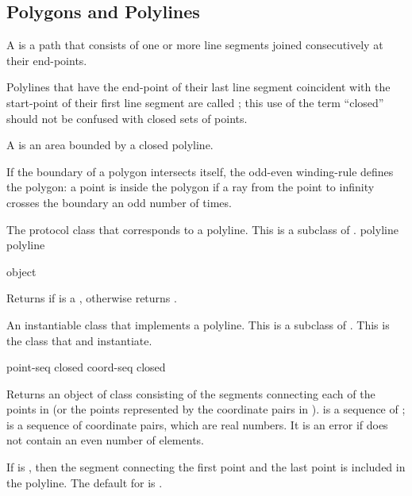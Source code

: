 \subsection {Polygons and Polylines}

A  is a path that consists of one or more line segments joined
consecutively at their end-points.

Polylines that have the end-point of their last line segment coincident with the
start-point of their first line segment are called ; this use of
the term ``closed'' should not be confused with closed sets of points.

A  is an area bounded by a closed polyline. 

If the boundary of a polygon intersects itself, the odd-even winding-rule
defines the polygon: a point is inside the polygon if a ray from the point to
infinity crosses the boundary an odd number of times.


The protocol class that corresponds to a polyline.  This is a subclass of
.
 {polyline} {polyline}

 {object}

Returns  if  is a , otherwise returns
.


An instantiable class that implements a polyline.  This is a subclass of
.  This is the class that  and
 instantiate.
\Immutable

  {point-seq \key closed}
 {coord-seq \key closed}

Returns an object of class  consisting of the segments
connecting each of the points in  (or the points represented by
the coordinate pairs in ).   is a sequence of
;  is a sequence of coordinate pairs, which are real
numbers.  It is an error if  does not contain an even number of
elements.

If  is , then the segment connecting the first point and
the last point is included in the polyline.  The default for  is
.

\MayCaptureInputs


